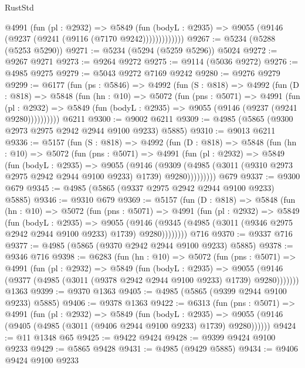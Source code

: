 \begin{lexlean}{RustStd}
\begin{coremodule}
              @4991
                (fun (pl : @2932) =>
                @5849
                  (fun (bodyL : @2935) =>
                  @9055 (@9146 (@9237 (@9241 (@9116 (@7170 @9242)))))))))))))
@9267 := @5234 (@5288 (@5253 @5290))
@9271 := @5234 (@5294 (@5259 @5296)) @5024
@9272 := @9267 @9271
@9273 := @9264 @9272
@9275 := @9114 (@5036 @9272)
@9276 := @4985 @9275
@9279 := @5043 @9272 @7169 @9242
@9280 := @9276 @9279
@9299 := @6177
    (fun (ps : @5846) =>
    @4992
      (fun (S : @818) =>
      @4992
        (fun (D : @818) =>
        @5848
          (fun (hn : @10) =>
          @5072
            (fun (pns : @5071) =>
            @4991
              (fun (pl : @2932) =>
              @5849 (fun (bodyL : @2935) => @9055 (@9146 (@9237 (@9241 @9280))))))))))
    @6211
@9300 := @9002 @6211
@9309 := @4985 (@5865 (@9300 @2973 @2975 @2942 @2944 @9100 @9233) @5885)
@9310 := @9013 @6211
@9336 := @5157
    (fun (S : @818) =>
    @4992
      (fun (D : @818) =>
      @5848
        (fun (hn : @10) =>
        @5072
          (fun (pns : @5071) =>
          @4991
            (fun (pl : @2932) =>
            @5849
              (fun (bodyL : @2935) =>
              @9055
                (@9146
                  (@9309
                    (@4985 (@3011 (@9310 @2973 @2975 @2942 @2944 @9100 @9233) @1739) @9280)))))))))
    @679
@9337 := @9300 @679
@9345 := @4985 (@5865 (@9337 @2975 @2942 @2944 @9100 @9233) @5885)
@9346 := @9310 @679
@9369 := @5157
    (fun (D : @818) =>
    @5848
      (fun (hn : @10) =>
      @5072
        (fun (pns : @5071) =>
        @4991
          (fun (pl : @2932) =>
          @5849
            (fun (bodyL : @2935) =>
            @9055
              (@9146 (@9345 (@4985 (@3011 (@9346 @2975 @2942 @2944 @9100 @9233) @1739) @9280))))))))
    @716
@9370 := @9337 @716
@9377 := @4985 (@5865 (@9370 @2942 @2944 @9100 @9233) @5885)
@9378 := @9346 @716
@9398 := @6283
    (fun (hn : @10) =>
    @5072
      (fun (pns : @5071) =>
      @4991
        (fun (pl : @2932) =>
        @5849
          (fun (bodyL : @2935) =>
          @9055 (@9146 (@9377 (@4985 (@3011 (@9378 @2942 @2944 @9100 @9233) @1739) @9280)))))))
    @1363
@9399 := @9370 @1363
@9405 := @4985 (@5865 (@9399 @2944 @9100 @9233) @5885)
@9406 := @9378 @1363
@9422 := @6313
    (fun (pns : @5071) =>
    @4991
      (fun (pl : @2932) =>
      @5849
        (fun (bodyL : @2935) =>
        @9055 (@9146 (@9405 (@4985 (@3011 (@9406 @2944 @9100 @9233) @1739) @9280))))))
@9424 := @11 @1348 @65
@9425 := @9422 @9424
@9428 := @9399 @9424 @9100 @9233
@9429 := @5865 @9428
@9431 := @4985 (@9429 @5885)
@9434 := @9406 @9424 @9100 @9233

\end{coremodule}
\end{lexlean}
